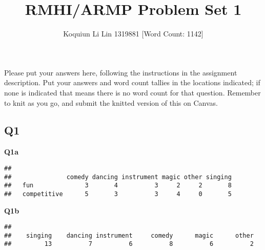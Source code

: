 \documentclass[
]{article}
\title{RMHI/ARMP Problem Set 1}
\author{Koquiun Li Lin 1319881 {[}Word Count: 1142{]}}
\date{}
\newenvironment{Shaded}{\begin{snugshade}}{\end{snugshade}}
\newcommand{\AttributeTok}[1]{\textcolor[rgb]{0.13,0.29,0.53}{#1}}
\newcommand{\CommentTok}[1]{\textcolor[rgb]{0.56,0.35,0.01}{\textit{#1}}}
\newcommand{\FunctionTok}[1]{\textcolor[rgb]{0.13,0.29,0.53}{\textbf{#1}}}
\newcommand{\NormalTok}[1]{#1}
\newcommand{\OtherTok}[1]{\textcolor[rgb]{0.56,0.35,0.01}{#1}}
\newcommand{\SpecialCharTok}[1]{\textcolor[rgb]{0.81,0.36,0.00}{\textbf{#1}}}
\newcommand{\StringTok}[1]{\textcolor[rgb]{0.31,0.60,0.02}{#1}}
\begin{document}
\maketitle

Please put your answers here, following the instructions in the
assignment description. Put your answers and word count tallies in the
locations indicated; if none is indicated that means there is no word
count for that question. Remember to knit as you go, and submit the
knitted version of this on Canvas.

\hypertarget{q1}{%
\subsection{Q1}\label{q1}}

\textbf{Q1a}

\begin{Shaded}
\end{Shaded}

\begin{verbatim}
##              
##               comedy dancing instrument magic other singing
##   fun              3       4          3     2     2       8
##   competitive      5       3          3     4     0       5
\end{verbatim}

\textbf{Q1b}

\begin{Shaded}
\end{Shaded}

\begin{verbatim}
## 
##    singing    dancing instrument     comedy      magic      other 
##         13          7          6          8          6          2
\end{verbatim}
\end{document}

